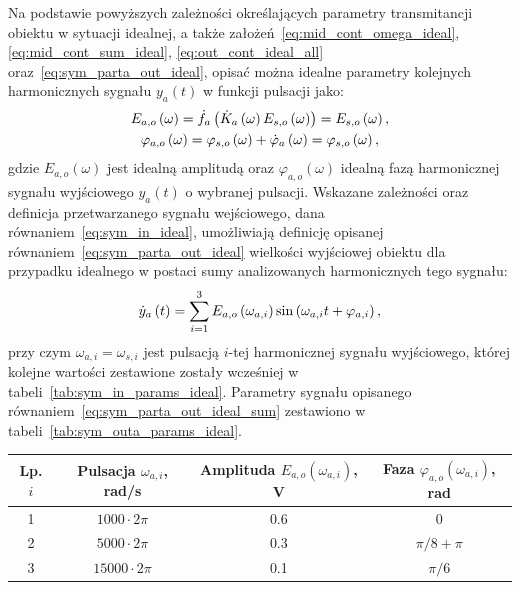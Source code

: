 Na podstawie powyższych zależności określających parametry transmitancji obiektu w sytuacji idealnej, a także założeń~\eqref{eq:mid_cont_omega_ideal}, \eqref{eq:mid_cont_sum_ideal}, \eqref{eq:out_cont_ideal_all} oraz~\eqref{eq:sym_parta_out_ideal}, opisać można idealne parametry kolejnych harmonicznych sygnału $y_{a}(t)$ w funkcji pulsacji jako:
\begin{gather}
E_{a,o} \left(\omega\right) = \dot{f}_{a} \left(\dot{K}_{a} \left(\omega\right) E_{s,o} \left(\omega\right)\right) = E_{s,o} \left(\omega\right) \label{eq:sym_parta_amp_out_ideal}, \\
\varphi_{a,o} \left(\omega\right) = \varphi_{s,o} \left(\omega\right) + \dot{\varphi}_{a} \left(\omega\right) = \varphi_{s,o} \left(\omega\right) \label{eq:sym_parta_phi_out_ideal},
\end{gather}
gdzie $E_{a,o}(\omega)$ jest idealną amplitudą oraz $\varphi_{a,o}(\omega)$ idealną fazą harmonicznej sygnału wyjściowego $y_{a}(t)$ o wybranej pulsacji. Wskazane zależności oraz definicja przetwarzanego sygnału wejściowego, dana równaniem~\eqref{eq:sym_in_ideal}, umożliwiają definicję opisanej równaniem~\eqref{eq:sym_parta_out_ideal} wielkości wyjściowej obiektu dla przypadku idealnego w postaci sumy analizowanych harmonicznych tego sygnału:
\begin{equation}
\dot{y}_{a} \left(t\right) = \sum _{i=1} ^{3} E_{a,o} \left(\omega_{a,i}\right) \sin \left(\omega_{a,i} t + \varphi_{a,i}\right) \label{eq:sym_parta_out_ideal_sum},
\end{equation}
przy czym $\omega_{a,i} = \omega_{s,i}$ jest pulsacją $i$-tej harmonicznej sygnału wyjściowego, której kolejne wartości zestawione zostały wcześniej w tabeli~\ref{tab:sym_in_params_ideal}. Parametry sygnału opisanego równaniem~\eqref{eq:sym_parta_out_ideal_sum} zestawiono w tabeli~\ref{tab:sym_outa_params_ideal}.

\begin{table}[htb!]
\begin{center}
\begin{tabular}[c]{| c | c | c | c |} \hline
\textbf{Lp. $i$} & \textbf{Pulsacja $\omega_{a,i}$, rad/s} & \textbf{Amplituda $E_{a,o}(\omega_{a,i})$, V} & \textbf{Faza $\varphi_{a,o}(\omega_{a,i})$, rad} \\ \hline
1 & $1000  \cdot 2\pi$ &  \num{0.6} & $0$             \\ \hline
2 & $5000  \cdot 2\pi$ &  \num{0.3} & $\pi/8 + \pi$   \\ \hline
3 & $15000 \cdot 2\pi$ &  \num{0.1} & $\pi/6$         \\ \hline
\end{tabular}
\end{center}
\end{table}

